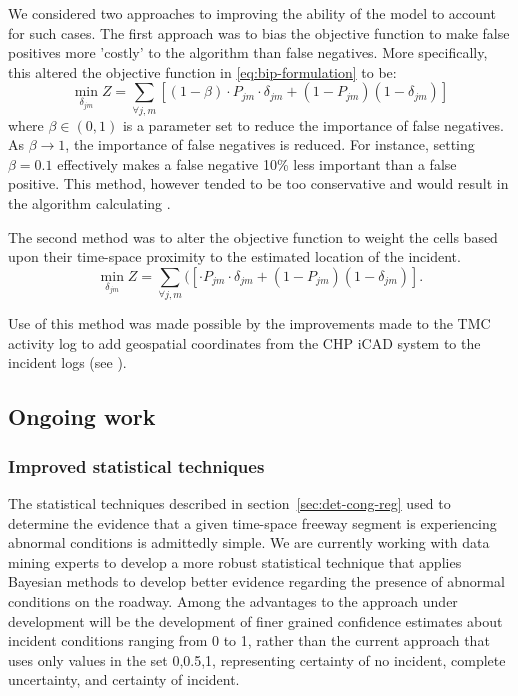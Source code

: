 \documentclass[12pt]{report}
\begin{document}
We considered two approaches to improving the ability of the model to account
for such cases.  The first approach was to bias the objective function to make
false positives more 'costly' to the algorithm than false negatives.  More
specifically, this altered the objective function in \eqref{eq:bip-formulation}
to be:
\begin{equation}
  \label{eq:false-positive-bias}
  \min\limits_{\delta_{jm}} Z = \sum\limits_{\forall{}j,m}\left[(1-\beta)\cdot{}P_{jm}\cdot{}\delta_{jm}+(1-P_{jm})(1-\delta_{jm})\right]
\end{equation}
where $\beta \in (0,1)$ is a parameter set to reduce the importance of false
negatives.  As $\beta \rightarrow 1$, the importance of false negatives is
reduced.  For instance, setting $\beta = 0.1$ effectively makes a false negative
10\% less important than a false positive.
%
This method, however tended to be too conservative and would result in the
algorithm calculating .

The second method was to alter the objective function to weight the cells based
upon their time-space proximity to the estimated location of the incident.  
\begin{equation}
    \label{eq:distance-weighting}
    \min\limits_{\delta_{jm}} Z = \sum\limits_{\forall{}j,m}\bigg(\left[\cdot{}P_{jm}\cdot{}\delta_{jm}+(1-P_{jm})(1-\delta_{jm})\right]\bigg.
\end{equation}

Use
of this method was made possible by the improvements made to the TMC activity
log to add geospatial coordinates from the CHP iCAD system to the incident logs
(see ).





\subsection{Ongoing work}
\label{sec:ongoing-work-incident-impact}

\subsubsection{Improved statistical techniques}
\label{sec:improved-stats}

The statistical techniques described in section~\ref{sec:det-cong-reg}
used to determine the evidence that a given time-space freeway segment
is experiencing abnormal conditions is admittedly simple.  We are
currently working with data mining experts to develop a more robust
statistical technique that applies Bayesian methods to develop better
evidence regarding the presence of abnormal conditions on the roadway.
Among the advantages to the approach under development will be the
development of finer grained confidence estimates about incident
conditions ranging from 0 to 1, rather than the current approach that
uses only values in the set {0,0.5,1}, representing certainty of no
incident, complete uncertainty, and certainty of incident.  
\end{document}
